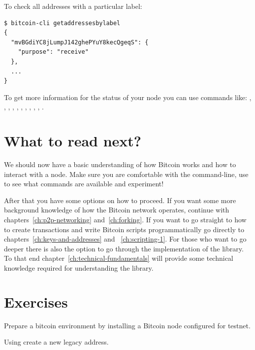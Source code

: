 \noindent To check all addresses with a particular label:
\begin{emphbox}
\begin{lstlisting}[style=Bash]
$ bitcoin-cli getaddressesbylabel
{ 
  "mvBGdiYC8jLumpJ142ghePYuY8kecQgeqS": {
    "purpose": "receive"
  },
  ...
}
\end{lstlisting}
\end{emphbox}
\vspace{1em}


To get more information for the status of your node you can use commands like: , , , , , , , , , , .


\section{What to read next?}
We should now have a basic understanding of how Bitcoin works and how to interact with a node. Make sure you are comfortable with the command-line, use  to see what commands are available and experiment!

After that you have some options on how to proceed. If you want some more background knowledge of how the Bitcoin network operates, continue with chapters~\ref{ch:p2p-networking} and~\ref{ch:forking}. If you want to go straight to how to create transactions and write Bitcoin scripts programmatically go directly to chapters~\ref{ch:keys-and-addresses} and ~\ref{ch:scripting-1}. For those who want to go deeper there is also the option to go through the implementation of the  library. To that end chapter~\ref{ch:technical-fundamentals} will provide some technical knowledge required for understanding the library.



\section{Exercises}

\begin{exercise}
Prepare a bitcoin environment by installing a Bitcoin node configured for testnet. 
\end{exercise}

\begin{exercise}
Using  create a new legacy address.
\end{exercise}

